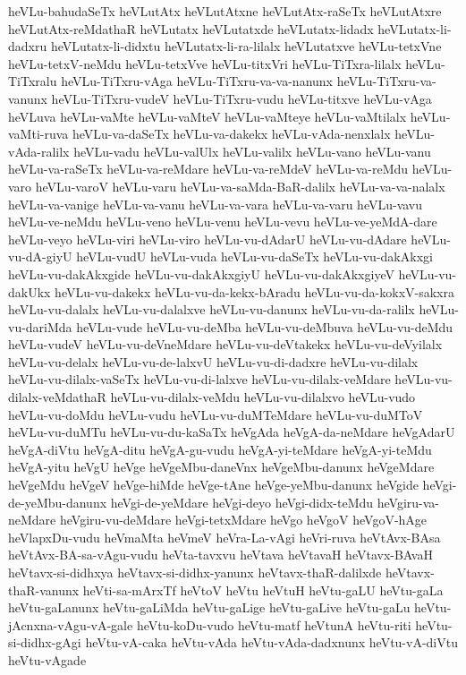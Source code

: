 {heVLu-bahudaSeTx
heVLutAtx
heVLutAtxne
heVLutAtx-raSeTx
heVLutAtxre
heVLutAtx-reMdathaR
heVLutatx
heVLutatxde
heVLutatx-lidadx
heVLutatx-li-dadxru
heVLutatx-li-didxtu
heVLutatx-li-ra-lilalx
heVLutatxve
heVLu-tetxVne
heVLu-tetxV-neMdu
heVLu-tetxVve
heVLu-titxVri
heVLu-TiTxra-lilalx
heVLu-TiTxralu
heVLu-TiTxru-vAga
heVLu-TiTxru-va-va-nanunx
heVLu-TiTxru-va-vanunx
heVLu-TiTxru-vudeV
heVLu-TiTxru-vudu
heVLu-titxve
heVLu-vAga
heVLuva
heVLu-vaMte
heVLu-vaMteV
heVLu-vaMteye
heVLu-vaMtilalx
heVLu-vaMti-ruva
heVLu-va-daSeTx
heVLu-va-dakekx
heVLu-vAda-nenxlalx
heVLu-vAda-ralilx
heVLu-vadu
heVLu-valUlx
heVLu-valilx
heVLu-vano
heVLu-vanu
heVLu-va-raSeTx
heVLu-va-reMdare
heVLu-va-reMdeV
heVLu-va-reMdu
heVLu-varo
heVLu-varoV
heVLu-varu
heVLu-va-saMda-BaR-dalilx
heVLu-va-va-nalalx
heVLu-va-vanige
heVLu-va-vanu
heVLu-va-vara
heVLu-va-varu
heVLu-vavu
heVLu-ve-neMdu
heVLu-veno
heVLu-venu
heVLu-vevu
heVLu-ve-yeMdA-dare
heVLu-veyo
heVLu-viri
heVLu-viro
heVLu-vu-dAdarU
heVLu-vu-dAdare
heVLu-vu-dA-giyU
heVLu-vudU
heVLu-vuda
heVLu-vu-daSeTx
heVLu-vu-dakAkxgi
heVLu-vu-dakAkxgide
heVLu-vu-dakAkxgiyU
heVLu-vu-dakAkxgiyeV
heVLu-vu-dakUkx
heVLu-vu-dakekx
heVLu-vu-da-kekx-bAradu
heVLu-vu-da-kokxV-sakxra
heVLu-vu-dalalx
heVLu-vu-dalalxve
heVLu-vu-danunx
heVLu-vu-da-ralilx
heVLu-vu-dariMda
heVLu-vude
heVLu-vu-deMba
heVLu-vu-deMbuva
heVLu-vu-deMdu
heVLu-vudeV
heVLu-vu-deVneMdare
heVLu-vu-deVtakekx
heVLu-vu-deVyilalx
heVLu-vu-delalx
heVLu-vu-de-lalxvU
heVLu-vu-di-dadxre
heVLu-vu-dilalx
heVLu-vu-dilalx-vaSeTx
heVLu-vu-di-lalxve
heVLu-vu-dilalx-veMdare
heVLu-vu-dilalx-veMdathaR
heVLu-vu-dilalx-veMdu
heVLu-vu-dilalxvo
heVLu-vudo
heVLu-vu-doMdu
heVLu-vudu
heVLu-vu-duMTeMdare
heVLu-vu-duMToV
heVLu-vu-duMTu
heVLu-vu-du-kaSaTx
heVgAda
heVgA-da-neMdare
heVgAdarU
heVgA-diVtu
heVgA-ditu
heVgA-gu-vudu
heVgA-yi-teMdare
heVgA-yi-teMdu
heVgA-yitu
heVgU
heVge
heVgeMbu-daneVnx
heVgeMbu-danunx
heVgeMdare
heVgeMdu
heVgeV
heVge-hiMde
heVge-tAne
heVge-yeMbu-danunx
heVgide
heVgi-de-yeMbu-danunx
heVgi-de-yeMdare
heVgi-deyo
heVgi-didx-teMdu
heVgiru-va-neMdare
heVgiru-vu-deMdare
heVgi-tetxMdare
heVgo
heVgoV
heVgoV-hAge
heVlapxDu-vudu
heVmaMta
heVmeV
heVra-La-vAgi
heVri-ruva
heVtAvx-BAsa
heVtAvx-BA-sa-vAgu-vudu
heVta-tavxvu
heVtava
heVtavaH
heVtavx-BAvaH
heVtavx-si-didhxya
heVtavx-si-didhx-yanunx
heVtavx-thaR-dalilxde
heVtavx-thaR-vanunx
heVti-sa-mArxTf
heVtoV
heVtu
heVtuH
heVtu-gaLU
heVtu-gaLa
heVtu-gaLanunx
heVtu-gaLiMda
heVtu-gaLige
heVtu-gaLive
heVtu-gaLu
heVtu-jAcnxna-vAgu-vA-gale
heVtu-koDu-vudo
heVtu-matf
heVtunA
heVtu-riti
heVtu-si-didhx-gAgi
heVtu-vA-caka
heVtu-vAda
heVtu-vAda-dadxnunx
heVtu-vA-diVtu
heVtu-vAgade
}
